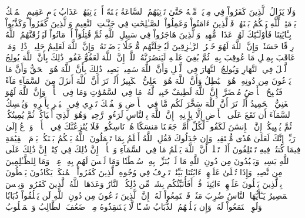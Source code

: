 وَلَا يَزَالُ ٱلَّذِينَ كَفَرُواْ فِي مِرۡيَةٖ مِّنۡهُ حَتَّىٰ تَأۡتِيَهُمُ ٱلسَّاعَةُ بَغۡتَةً أَوۡ يَأۡتِيَهُمۡ عَذَابُ يَوۡمٍ عَقِيمٍ
ٱلۡمُلۡكُ يَوۡمَئِذٖ لِّلَّهِ يَحۡكُمُ بَيۡنَهُمۡۚ فَٱلَّذِينَ ءَامَنُواْ وَعَمِلُواْ ٱلصَّـٰلِحَٰتِ فِي جَنَّـٰتِ ٱلنَّعِيمِ
وَٱلَّذِينَ كَفَرُواْ وَكَذَّبُواْ بِـَٔايَٰتِنَا فَأُوْلَـٰٓئِكَ لَهُمۡ عَذَابٞ مُّهِينٞ
وَٱلَّذِينَ هَاجَرُواْ فِي سَبِيلِ ٱللَّهِ ثُمَّ قُتِلُوٓاْ أَوۡ مَاتُواْ لَيَرۡزُقَنَّهُمُ ٱللَّهُ رِزۡقًا حَسَنٗاۚ وَإِنَّ ٱللَّهَ لَهُوَ خَيۡرُ ٱلرَّـٰزِقِينَ
لَيُدۡخِلَنَّهُم مُّدۡخَلٗا يَرۡضَوۡنَهُۥۚ وَإِنَّ ٱللَّهَ لَعَلِيمٌ حَلِيمٞ
۞ذَٰلِكَۖ وَمَنۡ عَاقَبَ بِمِثۡلِ مَا عُوقِبَ بِهِۦ ثُمَّ بُغِيَ عَلَيۡهِ لَيَنصُرَنَّهُ ٱللَّهُۚ إِنَّ ٱللَّهَ لَعَفُوٌّ غَفُورٞ
ذَٰلِكَ بِأَنَّ ٱللَّهَ يُولِجُ ٱلَّيۡلَ فِي ٱلنَّهَارِ وَيُولِجُ ٱلنَّهَارَ فِي ٱلَّيۡلِ وَأَنَّ ٱللَّهَ سَمِيعُۢ بَصِيرٞ
ذَٰلِكَ بِأَنَّ ٱللَّهَ هُوَ ٱلۡحَقُّ وَأَنَّ مَا يَدۡعُونَ مِن دُونِهِۦ هُوَ ٱلۡبَٰطِلُ وَأَنَّ ٱللَّهَ هُوَ ٱلۡعَلِيُّ ٱلۡكَبِيرُ
أَلَمۡ تَرَ أَنَّ ٱللَّهَ أَنزَلَ مِنَ ٱلسَّمَآءِ مَآءٗ فَتُصۡبِحُ ٱلۡأَرۡضُ مُخۡضَرَّةًۚ إِنَّ ٱللَّهَ لَطِيفٌ خَبِيرٞ
لَّهُۥ مَا فِي ٱلسَّمَٰوَٰتِ وَمَا فِي ٱلۡأَرۡضِۚ وَإِنَّ ٱللَّهَ لَهُوَ ٱلۡغَنِيُّ ٱلۡحَمِيدُ
أَلَمۡ تَرَ أَنَّ ٱللَّهَ سَخَّرَ لَكُم مَّا فِي ٱلۡأَرۡضِ وَٱلۡفُلۡكَ تَجۡرِي فِي ٱلۡبَحۡرِ بِأَمۡرِهِۦ وَيُمۡسِكُ ٱلسَّمَآءَ أَن تَقَعَ عَلَى ٱلۡأَرۡضِ إِلَّا بِإِذۡنِهِۦٓۚ إِنَّ ٱللَّهَ بِٱلنَّاسِ لَرَءُوفٞ رَّحِيمٞ
وَهُوَ ٱلَّذِيٓ أَحۡيَاكُمۡ ثُمَّ يُمِيتُكُمۡ ثُمَّ يُحۡيِيكُمۡۗ إِنَّ ٱلۡإِنسَٰنَ لَكَفُورٞ
لِّكُلِّ أُمَّةٖ جَعَلۡنَا مَنسَكًا هُمۡ نَاسِكُوهُۖ فَلَا يُنَٰزِعُنَّكَ فِي ٱلۡأَمۡرِۚ وَٱدۡعُ إِلَىٰ رَبِّكَۖ إِنَّكَ لَعَلَىٰ هُدٗى مُّسۡتَقِيمٖ
وَإِن جَٰدَلُوكَ فَقُلِ ٱللَّهُ أَعۡلَمُ بِمَا تَعۡمَلُونَ
ٱللَّهُ يَحۡكُمُ بَيۡنَكُمۡ يَوۡمَ ٱلۡقِيَٰمَةِ فِيمَا كُنتُمۡ فِيهِ تَخۡتَلِفُونَ
أَلَمۡ تَعۡلَمۡ أَنَّ ٱللَّهَ يَعۡلَمُ مَا فِي ٱلسَّمَآءِ وَٱلۡأَرۡضِۚ إِنَّ ذَٰلِكَ فِي كِتَٰبٍۚ إِنَّ ذَٰلِكَ عَلَى ٱللَّهِ يَسِيرٞ
وَيَعۡبُدُونَ مِن دُونِ ٱللَّهِ مَا لَمۡ يُنَزِّلۡ بِهِۦ سُلۡطَٰنٗا وَمَا لَيۡسَ لَهُم بِهِۦ عِلۡمٞۗ وَمَا لِلظَّـٰلِمِينَ مِن نَّصِيرٖ
وَإِذَا تُتۡلَىٰ عَلَيۡهِمۡ ءَايَٰتُنَا بَيِّنَٰتٖ تَعۡرِفُ فِي وُجُوهِ ٱلَّذِينَ كَفَرُواْ ٱلۡمُنكَرَۖ يَكَادُونَ يَسۡطُونَ بِٱلَّذِينَ يَتۡلُونَ عَلَيۡهِمۡ ءَايَٰتِنَاۗ قُلۡ أَفَأُنَبِّئُكُم بِشَرّٖ مِّن ذَٰلِكُمُۚ ٱلنَّارُ وَعَدَهَا ٱللَّهُ ٱلَّذِينَ كَفَرُواْۖ وَبِئۡسَ ٱلۡمَصِيرُ
يَـٰٓأَيُّهَا ٱلنَّاسُ ضُرِبَ مَثَلٞ فَٱسۡتَمِعُواْ لَهُۥٓۚ إِنَّ ٱلَّذِينَ تَدۡعُونَ مِن دُونِ ٱللَّهِ لَن يَخۡلُقُواْ ذُبَابٗا وَلَوِ ٱجۡتَمَعُواْ لَهُۥۖ وَإِن يَسۡلُبۡهُمُ ٱلذُّبَابُ شَيۡـٔٗا لَّا يَسۡتَنقِذُوهُ مِنۡهُۚ ضَعُفَ ٱلطَّالِبُ وَٱلۡمَطۡلُوبُ
